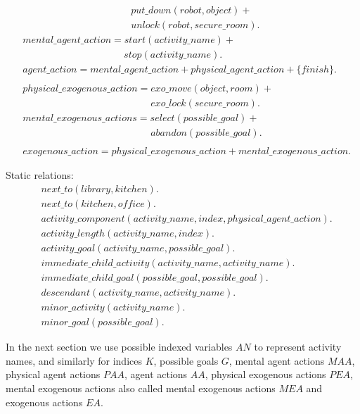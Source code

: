 \documentclass[11pt, oneside]{article}
\begin{document}
\begin{allowdisplaybreaks}
\begin{align*}
  &\qquad\qquad\qquad\qquad\qquad\quad put\_down(robot,object) +\\
  &\qquad\qquad\qquad\qquad\qquad\quad unlock(robot,secure\_room).\\
&mental\_agent\_action =   start(activity\_name) +\\
  &\qquad\qquad\qquad\qquad\qquad\; stop(activity\_name).\\
  &agent\_action = mental\_agent\_action + physical\_agent\_action + \{finish\}.\\
\\
&physical\_exogenous\_action = exo\_move(object, room) + \\
  &\qquad\qquad\qquad\qquad\qquad\qquad\quad exo\_lock(secure\_room).\\
  &mental\_exogenous\_actions = select(possible\_goal) + \\
&\qquad\qquad\qquad\qquad\qquad\qquad\quad  abandon(possible\_goal).\\
\\
&exogenous\_action = physical\_exogenous\_action + mental\_exogenous\_action.
\end{align*}
\end{allowdisplaybreaks}



Static relations:
\begin{align*}
  &next\_to(library, kitchen).\\
  &next\_to(kitchen, office).\\
  &activity\_component(activity\_name, index, physical\_agent\_action).\\
  &activity\_length(activity\_name, index).\\
  &activity\_goal(activity\_name, possible\_goal).\\
  &immediate\_child\_activity(activity\_name, activity\_name).\\
  &immediate\_child\_goal(possible\_goal, possible\_goal).\\
  &descendant(activity\_name, activity\_name).\\
  &minor\_activity(activity\_name).\\
  &minor\_goal(possible\_goal).
\end{align*}


In the next section we use possible indexed variables $AN$ to represent activity names, and similarly for indices $K$, possible goals $G$, mental agent actions $MAA$, physical agent actions $PAA$,
agent actions $AA$, physical exogenous actions $PEA$, mental exogenous actions also called mental exogenous actions $MEA$ and exogenous actions $EA$.
\end{document}
